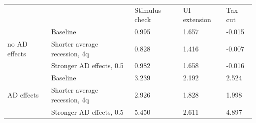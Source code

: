 \begin{tabular}{@{}lllll@{}}
\toprule
                  &                & Stimulus check & UI extension & Tax cut \\ \cmidrule(l){1-5}
    \multirow{3}{*}{no AD effects} & Baseline & 0.995 & 1.657 & -0.015 \\
                       & Shorter average recession, 4q & 0.828 & 1.416 & -0.007 \\
                       & Stronger AD effects, 0.5 & 0.982 & 1.658 & -0.016 \\ \cmidrule(l){1-5}
    \multirow{3}{*}{AD effects} & Baseline & 3.239 & 2.192 & 2.524 \\
                       & Shorter average recession, 4q & 2.926 & 1.828 & 1.998 \\
                       & Stronger AD effects, 0.5 & 5.450 & 2.611 & 4.897 \\ \cmidrule(l){1-5}
\end{tabular}

